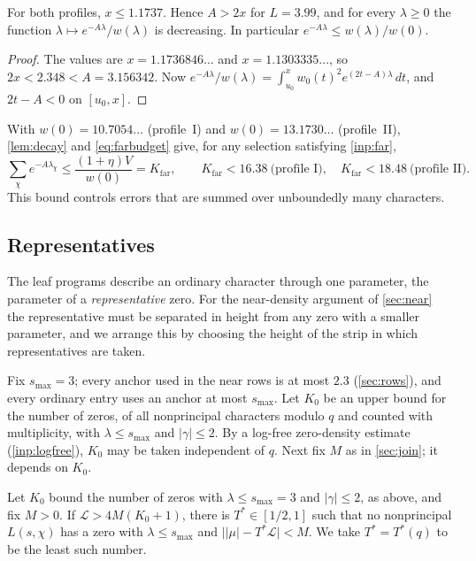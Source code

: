 \documentclass[11pt]{amsart}
\numberwithin{equation}{section}
\theoremstyle{plain}
\theoremstyle{definition}
\theoremstyle{remark}
\newcommand{\LL}{\mathcal{L}}
\newcommand{\1}{\mathbf{1}}
\begin{document}
\begin{lemma}\label{lem:decay}
For both profiles, $x\le1.1737$. Hence $A>2x$ for $L=3.99$, and for every $\lambda\ge0$ the function
$\lambda\mapsto e^{-A\lambda}/w(\lambda)$ is decreasing. In particular
$e^{-A\lambda}\le w(\lambda)/w(0)$.
\end{lemma}

\begin{proof}
The values are $x=1.1736846\ldots$ and $x=1.1303335\ldots$, so $2x<2.348<A=3.156342$. Now
$e^{-A\lambda}/w(\lambda)=\int_{u_0}^xw_0(t)^2e^{(2t-A)\lambda}\,dt$, and $2t-A<0$ on
$[u_0,x]$.
\end{proof}

With $w(0)=10.7054\ldots$ (profile~I) and $w(0)=13.1730\ldots$ (profile~II), \cref{lem:decay} and
\eqref{eq:farbudget} give, for any selection satisfying \cref{inp:far},
\begin{equation}\label{eq:Kfar}
  \sum_\chi e^{-A\lambda_\chi}\le\frac{(1+\eta)V}{w(0)}=K_{\mathrm{far}},\qquad
  K_{\mathrm{far}}<16.38\ \text{(profile I)},\quad K_{\mathrm{far}}<18.48\ \text{(profile II)}.
\end{equation}
This bound controls errors that are summed over unboundedly many characters.

\subsection{Representatives}\label{subsec:representatives}
The leaf programs describe an ordinary character through one parameter, the parameter of a
\emph{representative} zero. For the near-density argument of \cref{sec:near} the representative
must be separated in height from any zero with a smaller parameter, and we arrange this by
choosing the height of the strip in which representatives are taken.

Fix $s_{\max}=3$; every anchor used in the near rows is at most $2.3$ (\cref{sec:rows}), and every
ordinary entry uses an anchor at most $s_{\max}$. Let $K_0$ be an upper bound for
the number of zeros, of all nonprincipal characters modulo $q$ and counted with multiplicity,
with $\lambda\le s_{\max}$ and $|\gamma|\le2$. By a log-free zero-density estimate
(\cref{inp:logfree}), $K_0$ may be taken independent of $q$. Next fix $M$ as in \cref{sec:join};
it depends on $K_0$.

\begin{lemma}\label{lem:Tstar}
Let $K_0$ bound the number of zeros with $\lambda\le s_{\max}=3$ and $|\gamma|\le2$,
as above, and fix $M>0$. If $\LL>4M(K_0+1)$, there is $T^*\in[1/2,1]$ such that no nonprincipal $L(s,\chi)$ has a zero with
$\lambda\le s_{\max}$ and $\bigl||\mu|-T^*\LL\bigr|<M$. We take $T^*=T^*(q)$ to be the least such number.
\end{lemma}
\end{document}
